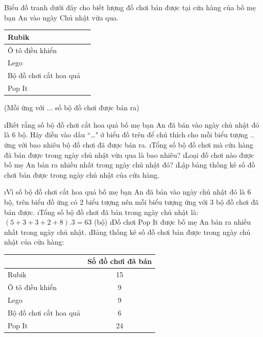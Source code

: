 \begin{bt}
	Biểu đồ tranh dưới đây cho biết lượng đồ chơi bán được tại cửa hàng của bố mẹ bạn An vào ngày Chủ nhật vừa qua. 
	\begin{center}
		\begin{tabular}{|l|l|}
			\hline
			Rubik& \\
			 \hline
			Ô tô điều khiển	& \\
			\hline
			Lego&	\\
			\hline
			Bộ đồ chơi cắt hoa quả&	\\
			\hline
			Pop It&	\\
			\hline
		\end{tabular}
	
	\vspace*{5pt}
	(Mỗi  ứng với ... số bộ đồ chơi được bán ra)
	\end{center}
	\begin{enumerate}[a),leftmargin=*]
		\i Biết rằng số bộ đồ chơi cắt hoa quả bố mẹ bạn An đã bán vào ngày chủ nhật đó là 6 bộ. Hãy điền vào dấu  ``\ldots" ở biểu đồ trên để chú thích cho mỗi biểu tượng .. ứng với bao nhiêu bộ đồ chơi đã được bán ra.
		\i Tổng số bộ đồ chơi mà cửa hàng đã bán được trong ngày chủ nhật vừa qua là bao nhiêu?
		\i Loại đồ chơi nào được bố mẹ An bán ra nhiều nhất trong ngày chủ nhật đó?
		\i Lập bảng thống kê số đồ chơi bán được trong ngày chủ nhật của cửa hàng.
	\end{enumerate}
	\begin{loigiaichuong40}
		\begin{enumerate}[a),leftmargin=*]
			\i Vì số bộ đồ chơi cắt hoa quả bố mẹ bạn An đã bán vào ngày chủ nhật đó là 6 bộ, trên biểu đồ ứng có 2 biểu tượng nên mỗi biểu tượng  ứng với 3 bộ đồ chơi đã bán được.
			\i Tổng số bộ đồ chơi đã bán trong ngày chủ nhật là: $\left( {5 + 3 + 3 + 2 + 8} \right).3 = 63$  (bộ)
			\i Đồ chơi Pop It được bố mẹ An bán ra nhiều nhất trong ngày chủ nhật.
			\i Bảng thống kê số đồ chơi bán được trong ngày chủ nhật của cửa hàng:
			\begin{center}
				\begin{tabular}{|l|c|}
					\hline
					&Số đồ chơi đã bán\\
					\hline
					Rubik&	15\\
					\hline
					Ô tô điều khiển&	9\\
					\hline
					Lego&	9\\
					\hline
					Bộ đồ chơi cắt hoa quả&	6\\
					\hline
					Pop It&	24\\
					\hline
				\end{tabular}
			\end{center}
		\end{enumerate}
	\end{loigiaichuong40}
\end{bt}
